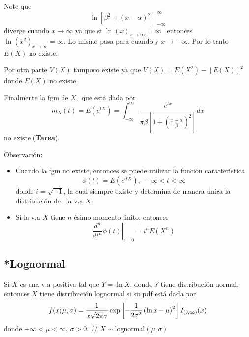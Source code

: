 \begin{i}
Note que 
\begin{equation*}
\left. \ln \left[ \beta ^{2}+(x-\alpha )^{2}\right] \right\vert _{-\infty
}^{\infty }
\end{equation*}%
diverge cuando $x\rightarrow \infty $ ya que si $\ln (x)_{x\rightarrow
\infty }=\infty $ \ entonces\ $\ln (x^{2})_{x\rightarrow \infty }=\infty$.
Lo mismo pasa para cuando y $x\rightarrow -\infty $.
Por lo tanto $E(X)$ no existe.

Por otra parte $V(X)$ tampoco existe ya que $V(X)=E(X^{2})-\left[ E(X)\right]^{2}$ donde $E(X)$ no existe.

Finalmente la fgm de $X,$ que está dada por 
\begin{equation*}
m_{X}(t)=E(e^{tX})=\int_{-\infty }^{\infty }\frac{e^{tx}}{\pi \beta \left[
1+\left( \frac{x-\alpha }{\beta }\right) ^{2}\right] }dx
\end{equation*}%
no existe (\textbf{Tarea}).

Observación:
\begin{itemize}
\item Cuando la fgm no existe, entonces se puede utilizar la función
característica 
\begin{equation*}
\phi (t)=E(e^{itX})\text{, }-\infty <t<\infty
\end{equation*}%
donde $i=\sqrt{-1}$, la cual siempre existe y determina de manera única
la distribución de \ la v.a $X.$

\item Si la v.a $X$ tiene $n$-ésimo momento finito, entonces 
\begin{equation*}
\left. \frac{d^{n}}{dt^{n}}\phi (t)\right\vert _{t=0}=i^{n}E(X^{n})
\end{equation*}
\end{itemize}

\bigskip

\subsection{*Lognormal}

\begin{definition}
Si $X$ es una v.a positiva tal que $Y=\ln X$, donde $Y$ tiene distribución normal, entonces $X$ tiene distribución lognormal si su pdf está dada por 
\begin{equation*}
f(x;\mu ,\sigma )=\frac{1}{x\sqrt{2\pi }\sigma }\exp \left[ -\frac{1}{%
2\sigma ^{2}}\left( \ln x-\mu \right) ^{2}\right] I_{(0,\infty )}(x)
\end{equation*}
donde $-\infty <\mu <\infty $, $\sigma >0.$ // $X\sim $lognormal$(\mu,\sigma )$
\end{definition}


\end{i}
